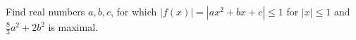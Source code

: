 Find real numbers $a, b, c$, for which $|f(x)| = |ax^2 + bx + c| \leq 1$ for $|x| \leq 1$ and $\frac{8}{3}a^2 + 2b^2$ is maximal.
